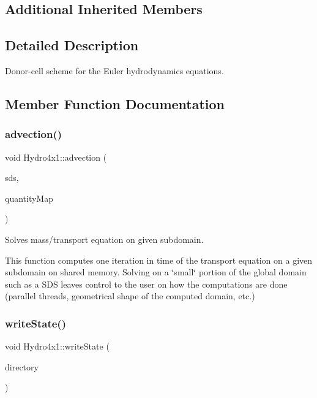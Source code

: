 \subsection*{Additional Inherited Members}


\subsection{Detailed Description}
Donor-\/cell scheme for the Euler hydrodynamics equations. 

\subsection{Member Function Documentation}
\mbox{\label{classHydro4x1_a92400c7b09a487d0a91d003fb903bf01}} 
\subsubsection{\texorpdfstring{advection()}{advection()}}
{\footnotesize\ttfamily void Hydro4x1\+::advection (\begin{DoxyParamCaption}\item[{const \mbox{\hyperlink{classSDShared}{S\+D\+Shared}} \&}]{sds,  }\item[{const std\+::map$<$ std\+::string, \mbox{\hyperlink{classQuantity}{Quantity}}$<$ real $>$ $\ast$ $>$ \&}]{quantity\+Map }\end{DoxyParamCaption})}



Solves mass/transport equation on given subdomain. 

This function computes one iteration in time of the transport equation on a given subdomain on shared memory. Solving on a \char`\"{}small\char`\"{} portion of the global domain such as a S\+DS leaves control to the user on how the computations are done (parallel threads, geometrical shape of the computed domain, etc.) \mbox{\label{classHydro4x1_a3c0c4f4b9f96e257ec011173caaf7142}} 
\subsubsection{\texorpdfstring{write\+State()}{writeState()}\hspace{0.1cm}{\footnotesize\ttfamily [1/2]}}
{\footnotesize\ttfamily void Hydro4x1\+::write\+State (\begin{DoxyParamCaption}\item[{std\+::string}]{directory }\end{DoxyParamCaption})}



